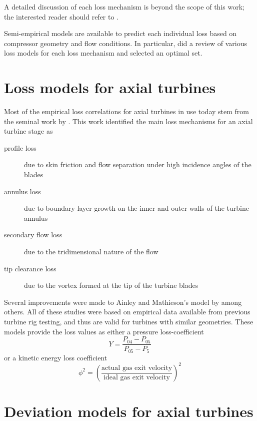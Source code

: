 \documentclass[tcc]{subfiles}
\begin{document}
A detailed discussion of each loss mechanism is beyond the scope of this work; 
the interested reader should refer to \textcite{Cumpsty2004}. 

Semi-empirical models are available to predict each individual loss based on compressor geometry and flow conditions. 
In particular, \textcite{Oh1997} did a review of various loss models for each loss mechanism and selected an optimal set.

\section{Loss models for axial turbines}

Most of the empirical loss correlations for axial turbines in use today stem from the seminal work by \textcite{Ainley1951}. This work identified the main loss mechanisms for an axial turbine stage as 
\begin{description}
    \item[profile loss] due to skin friction and flow separation under high incidence angles of the blades
    \item[annulus loss] due to boundary layer growth on the inner and outer walls of the turbine annulus
    \item[secondary flow loss] due to the tridimensional nature of the flow
    \item[tip clearance loss] due to the vortex formed at the tip of the turbine blades
\end{description}

Several improvements were made to Ainley and Mathieson's model by \textcite{Mukhtarov196, Dunham1970, Kacker1982, Moustapha1990, Benner1995} among others\cite{Persson2015}. All of these studies were based on empirical data available from previous turbine rig testing, and thus are valid for turbines with similar geometries.
These models provide the loss values as either a pressure loss-coefficient
\begin{equation}
    Y = \frac{P_{04}-P_{05}}{P_{05}-P_5}
\end{equation}
or a kinetic energy loss coefficient
\begin{equation}
    \phi^2 = \left(\frac{\text{actual gas exit velocity}}
                        {\text{ideal gas exit velocity}}\right)^2
\end{equation}

\section{Deviation models for axial turbines}
\end{document}
